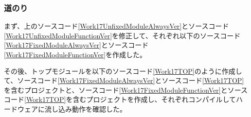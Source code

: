 \documentclass[a4paper]{jarticle}
\begin{document}
\subsubsection{道のり}
まず、上のソースコード\ref{Work17UnfixedModuleAlwaysVer}とソースコード\ref{Work17UnfixedModuleFunctionVer}を修正して、それぞれ以下のソースコード\ref{Work17FixedModuleAlwaysVer}とソースコード\ref{Work17FixedModuleFunctionVer}を作成した。


その後、トップモジュールを以下のソースコード\ref{Work17TOP}のように作成して、ソースコード\ref{Work17FixedModuleAlwaysVer}とソースコード\ref{Work17TOP}を含むプロジェクトと、ソースコード\ref{Work17FixedModuleFunctionVer}とソースコード\ref{Work17TOP}を含むプロジェクトを作成し、それぞれコンパイルしてハードウェアに流し込み動作を確認した。

\end{document}
